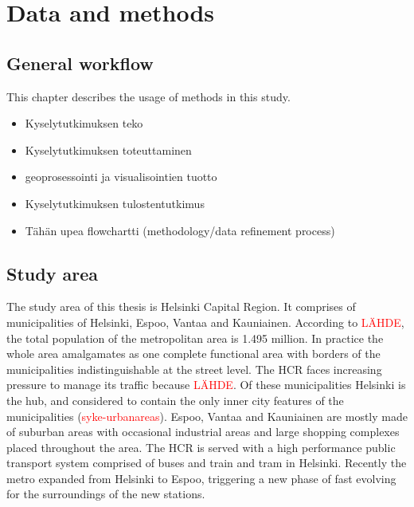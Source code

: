 \section{Data and methods}
\subsection{General workflow}
\justify
This chapter describes the usage of methods in this study.

\begin{itemize}
    \item Kyselytutkimuksen teko
    \item Kyselytutkimuksen toteuttaminen
    \item geoprosessointi ja visualisointien tuotto
    \item Kyselytutkimuksen tulostentutkimus
    \item Tähän upea flowchartti (methodology/data refinement process)
\end{itemize}

\subsection{Study area}
\justify
The study area of this thesis is Helsinki Capital Region. It comprises of municipalities of Helsinki, Espoo, Vantaa and Kauniainen. According to \textcolor{red}{LÄHDE}, the total population of the metropolitan area is 1.495 million. In practice the whole area amalgamates as one complete functional area with borders of the municipalities indistinguishable at the street level. The HCR faces increasing pressure to manage its traffic because \textcolor{red}{LÄHDE}. Of these municipalities Helsinki is the hub, and considered to contain the only inner city features of the municipalities (\textcolor{red}{syke-urbanareas}). Espoo, Vantaa and Kauniainen are mostly made of suburban areas with occasional industrial areas and large shopping complexes placed throughout the area. The HCR is served with a high performance public transport system comprised of buses and train and tram in Helsinki. Recently the metro expanded from Helsinki to Espoo, triggering a new phase of fast evolving for the surroundings of the new stations.

